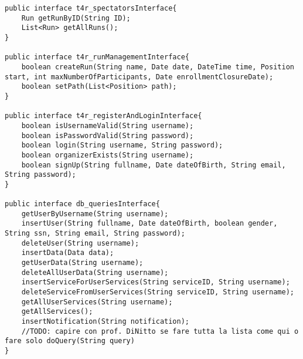 \documentclass[../../DD.tex]{subfiles}
\begin{document}
\begin{lstlisting}
public interface t4r_spectatorsInterface{
	Run getRunByID(String ID);
	List<Run> getAllRuns();
}

public interface t4r_runManagementInterface{
	boolean createRun(String name, Date date, DateTime time, Position start, int maxNumberOfParticipants, Date enrollmentClosureDate);
	boolean setPath(List<Position> path);
}

public interface t4r_registerAndLoginInterface{
	boolean isUsernameValid(String username);
	boolean isPasswordValid(String password);
	boolean login(String username, String password);
	boolean organizerExists(String username);
	boolean signUp(String fullname, Date dateOfBirth, String email, String password);
}

public interface db_queriesInterface{
	getUserByUsername(String username);
	insertUser(String fullname, Date dateOfBirth, boolean gender, String ssn, String email, String password);
	deleteUser(String username);
	insertData(Data data);
	getUserData(String username);
	deleteAllUserData(String username);
	insertServiceForUserServices(String serviceID, String username);
	deleteServiceFromUserServices(String serviceID, String username);
	getAllUserServices(String username);
	getAllServices();
	insertNotification(String notification);
	//TODO: capire con prof. DiNitto se fare tutta la lista come qui o fare solo doQuery(String query)
}
\end{lstlisting}
\end{document}
